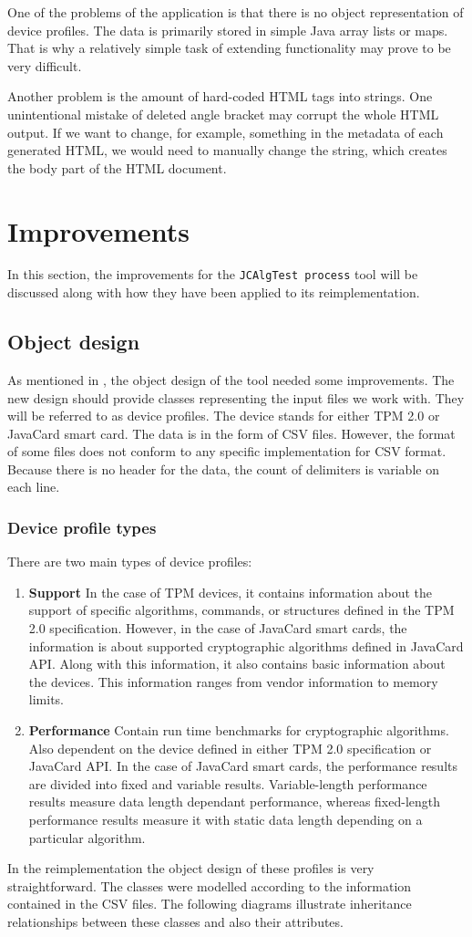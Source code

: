 One of the problems of the application is that there is no object representation of device profiles. The data is primarily stored in simple Java array lists or maps. That is why a relatively simple task of extending functionality may prove to be very difficult. 

Another problem is the amount of hard-coded HTML tags into strings. One unintentional mistake of deleted angle bracket may corrupt the whole HTML output. If we want to change, for example, something in the metadata of each generated HTML, we would need to manually change the string, which creates the body part of the HTML document. 

\section{Improvements}
In this section, the improvements for the \texttt{JCAlgTest process} tool will be discussed along with how they have been applied to its reimplementation.

\subsection{Object design}
As mentioned in , the object design of the tool needed some improvements. The new design should provide classes representing the input files we work with. They will be referred to as device profiles. The device stands for either TPM 2.0 or JavaCard smart card. The data is in the form of CSV files. However, the format of some files does not conform to any specific implementation for CSV format. Because there is no header for the data, the count of delimiters is variable on each line.

\subsubsection{Device profile types}
There are two main types of device profiles:
\begin{enumerate}
    \item \textbf{Support} In the case of TPM devices, it contains information about the support of specific algorithms, commands, or structures defined in the TPM 2.0 specification. However, in the case of JavaCard smart cards, the information is about supported cryptographic algorithms defined in JavaCard API. Along with this information, it also contains basic information about the devices. This information ranges from vendor information to memory limits.
    
    \item \textbf{Performance} Contain run time benchmarks for cryptographic algorithms. Also dependent on the device defined in either TPM 2.0 specification or JavaCard API. In the case of JavaCard smart cards, the performance results are divided into fixed and variable results. Variable-length performance results measure data length dependant performance, whereas fixed-length performance results measure it with static data length depending on a particular algorithm.
\end{enumerate}

In the reimplementation the object design of these profiles is very straightforward. The classes were modelled according to the information contained in the CSV files. The following diagrams illustrate inheritance relationships between these classes and also their attributes.

